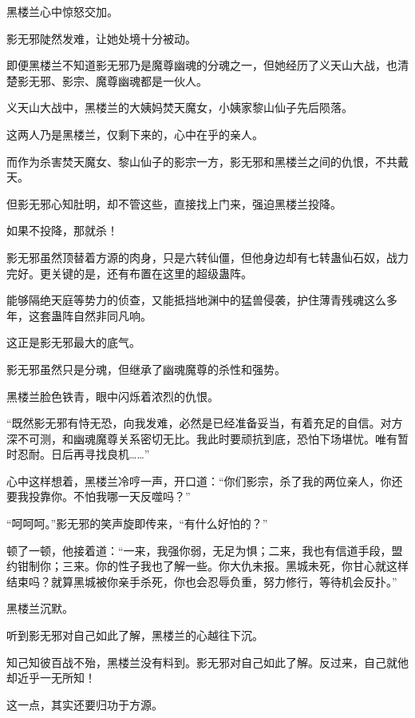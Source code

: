 
\begin{this_body}



黑楼兰心中惊怒交加。

影无邪陡然发难，让她处境十分被动。

即便黑楼兰不知道影无邪乃是魔尊幽魂的分魂之一，但她经历了义天山大战，也清楚影无邪、影宗、魔尊幽魂都是一伙人。

义天山大战中，黑楼兰的大姨妈焚天魔女，小姨家黎山仙子先后陨落。

这两人乃是黑楼兰，仅剩下来的，心中在乎的亲人。

而作为杀害焚天魔女、黎山仙子的影宗一方，影无邪和黑楼兰之间的仇恨，不共戴天。

但影无邪心知肚明，却不管这些，直接找上门来，强迫黑楼兰投降。

如果不投降，那就杀！

影无邪虽然顶替着方源的肉身，只是六转仙僵，但他身边却有七转蛊仙石奴，战力完好。更关键的是，还有布置在这里的超级蛊阵。

能够隔绝天庭等势力的侦查，又能抵挡地渊中的猛兽侵袭，护住薄青残魂这么多年，这套蛊阵自然非同凡响。

这正是影无邪最大的底气。

影无邪虽然只是分魂，但继承了幽魂魔尊的杀性和强势。

黑楼兰脸色铁青，眼中闪烁着浓烈的仇恨。

“既然影无邪有恃无恐，向我发难，必然是已经准备妥当，有着充足的自信。对方深不可测，和幽魂魔尊关系密切无比。我此时要顽抗到底，恐怕下场堪忧。唯有暂时忍耐。日后再寻找良机……”

心中这样想着，黑楼兰冷哼一声，开口道：“你们影宗，杀了我的两位亲人，你还要我投靠你。不怕我哪一天反噬吗？”

“呵呵呵。”影无邪的笑声旋即传来，“有什么好怕的？”

顿了一顿，他接着道：“一来，我强你弱，无足为惧；二来，我也有信道手段，盟约钳制你；三来。你的性子我也了解一些。你大仇未报。黑城未死，你甘心就这样结束吗？就算黑城被你亲手杀死，你也会忍辱负重，努力修行，等待机会反扑。”

黑楼兰沉默。

听到影无邪对自己如此了解，黑楼兰的心越往下沉。

知己知彼百战不殆，黑楼兰没有料到。影无邪对自己如此了解。反过来，自己就他却近乎一无所知！

这一点，其实还要归功于方源。


\end{this_body}
